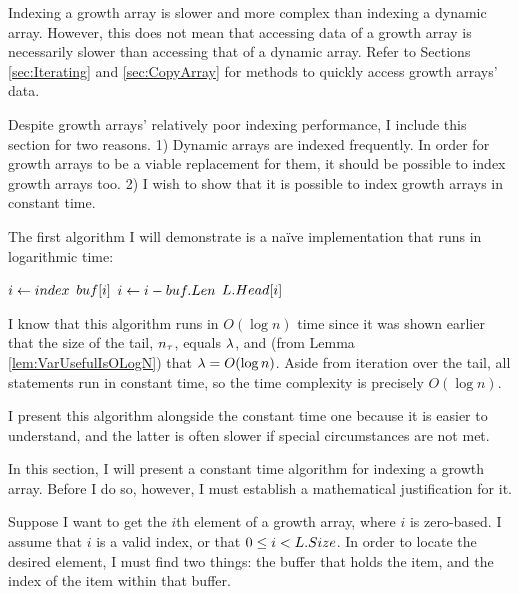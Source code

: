 \HdrGrowthArrayImpl

Indexing a growth array is slower and more complex than indexing a dynamic array. However, this does not mean that accessing data of a growth array is necessarily slower than accessing that of a dynamic array. Refer to Sections \ref{sec:Iterating} and \ref{sec:CopyArray} for methods to quickly access growth arrays' data.

Despite growth arrays' relatively poor indexing performance, I include this section for two reasons. 1) Dynamic arrays are indexed frequently. In order for growth arrays to be a viable replacement for them, it should be possible to index growth arrays too. 2) I wish to show that it is possible to index growth arrays in constant time.

\HdrLogarithmicImpl

The first algorithm I will demonstrate is a na\"{i}ve implementation that runs in logarithmic time:

\begin{algorithm}
	\begin{algorithmic}
		\Function{$\FuncGetItem$}{$\VarList,\ \ParamIndex$}
			\State $i \gets index$
					\State \Return $buf[i]$
				\EndIf
				\State $i \gets i - buf.Len$
			\EndFor
			\State \Return $L.Head[i]$
		\EndFunction
	\end{algorithmic}
\end{algorithm}

I know that this algorithm runs in $O(\log n)$ time since it was shown earlier that the size of the tail, $n_\tau$, equals $\lambda$, and (from Lemma \ref{lem:VarUsefulIsOLogN}) that $\lambda = O(\log n)$. Aside from iteration over the tail, all statements run in constant time, so the time complexity is precisely $O(\log n)$.

I present this algorithm alongside the constant time one because it is easier to understand, and the latter is often slower if special circumstances are not met.

\HdrConstantImpl

In this section, I will present a constant time algorithm for indexing a growth array. Before I do so, however, I must establish a mathematical justification for it.

Suppose I want to get the $i$th element of a growth array, where $i$ is zero-based. I assume that $i$ is a valid index, or that $0 \leq i < L.Size$. In order to locate the desired element, I must find two things: the buffer that holds the item, and the index of the item within that buffer.

